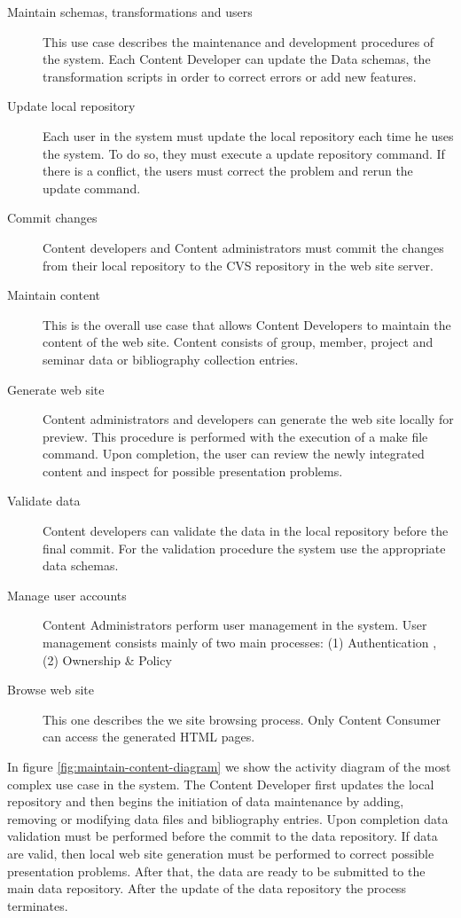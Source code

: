 \documentclass[10pt]{article}
\begin{document}
\begin{description}
\item[Maintain schemas, transformations and users] This use case describes the maintenance and development
 procedures of the system. Each Content Developer can update the Data schemas, the transformation scripts 
 in order to correct errors or add new features.

\item[Update local repository] Each user in the system must update the local repository each time he uses the system. 
To do so, they must execute a  update repository command. If there is a conflict, the users must correct the problem and rerun the
update command.

\item[Commit changes] Content developers and Content administrators must commit the changes from their local repository 
to the CVS repository in the web site server.

\item[Maintain content] This is the overall use case that allows Content Developers to maintain the content of the web site. 
Content consists of  group, member, project and seminar data or bibliography collection entries.

\item[Generate web site] Content administrators and developers can generate the web site locally for preview. This procedure is 
performed with the execution of a make file command. Upon completion, the user can review the newly integrated content and inspect 
for possible presentation problems.

\item[Validate data] Content developers can validate the data in the local repository before the final commit. For the validation procedure
the system use the appropriate data schemas.

\item[Manage user accounts] Content Administrators perform user management in the system. User management consists mainly of two main processes: (1) Authentication , (2) Ownership \& Policy

\item[Browse web site] This one describes the we site browsing process. Only Content Consumer can access the generated HTML pages.

\end{description} 

In figure \ref{fig:maintain-content-diagram} we show the activity diagram of the most complex use case in the system. The Content Developer first updates the local repository and then begins the initiation of data maintenance by adding, removing or modifying data files and bibliography entries. Upon completion data validation must be performed before the commit to the data repository. If data are valid, then local web site generation must be performed to correct possible presentation problems. After that, the data are ready to be submitted to the main data repository. After the update of the data repository the process terminates.
\end{document}
